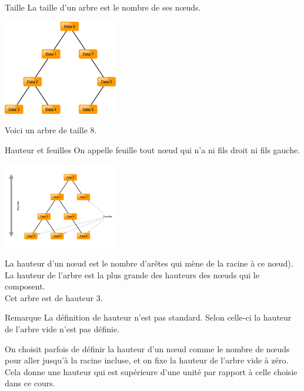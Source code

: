 \documentclass[10pt]{beamer}
\begin{document}
\begin{frame}{Taille}
La \alert{taille} d'un arbre est le nombre de ses n\oe uds.
    \begin{center}
    \includegraphics[width=5cm]{img/arbre_bin_5}
\end{center}
Voici un arbre de taille 8.

\end{frame}

\begin{frame}{Hauteur et feuilles}
On appelle \alert{feuille} tout n\oe ud qui n'a ni fils droit ni fils gauche.\\
    \begin{center}
    \includegraphics[width=5cm]{img/arbre_bin_3}
\end{center}\pause
La \alert{hauteur} d'un n\oe ud est le nombre d'arêtes qui mène de la racine à ce n\oe ud).\\\pause
La hauteur de l'arbre est la plus grande des hauteurs des n\oe uds qui le composent.\\\pause
Cet arbre est de hauteur 3.
\end{frame}
\begin{frame}{Remarque}
La définition de hauteur \alert{ n'est pas standard}. Selon celle-ci la hauteur de l'arbre vide n'est pas définie.\\\pause

On choisit parfois de définir la hauteur d'un n\oe ud comme le nombre de n\oe uds pour aller jusqu'à la racine incluse, et on fixe la hauteur de l'arbre vide à zéro.\\

Cela donne une hauteur qui est supérieure d'une unité par rapport à celle choisie dans ce cours.\pause
\end{frame}
\end{document}
